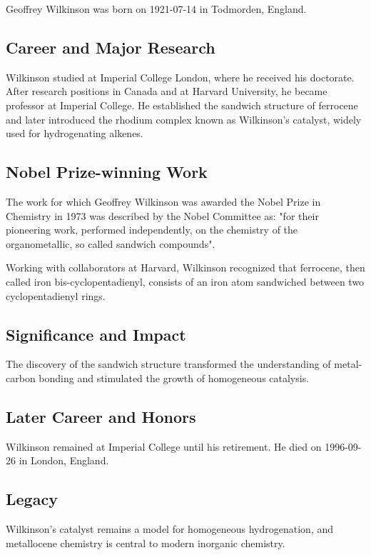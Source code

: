 Geoffrey Wilkinson was born on 1921-07-14 in Todmorden, England.

\subsection*{Career and Major Research}

Wilkinson studied at Imperial College London, where he received his doctorate. After research positions in Canada and at Harvard University, he became professor at Imperial College. He established the sandwich structure of ferrocene and later introduced the rhodium complex known as Wilkinson's catalyst, widely used for hydrogenating alkenes.

\subsection*{Nobel Prize-winning Work}

The work for which Geoffrey Wilkinson was awarded the Nobel Prize in Chemistry in 1973 was described by the Nobel Committee as: "for their pioneering work, performed independently, on the chemistry of the organometallic, so called sandwich compounds".

Working with collaborators at Harvard, Wilkinson recognized that ferrocene, then called iron bis-cyclopentadienyl, consists of an iron atom sandwiched between two cyclopentadienyl rings.

\subsection*{Significance and Impact}

The discovery of the sandwich structure transformed the understanding of metal-carbon bonding and stimulated the growth of homogeneous catalysis.

\subsection*{Later Career and Honors}

Wilkinson remained at Imperial College until his retirement. He died on 1996-09-26 in London, England.

\subsection*{Legacy}

Wilkinson's catalyst remains a model for homogeneous hydrogenation, and metallocene chemistry is central to modern inorganic chemistry.

